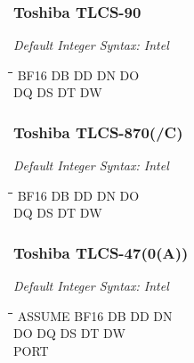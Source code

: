 \subsubsection{Toshiba TLCS-90}

{\em Default Integer Syntax: Intel}

{\tt\begin{tabbing}
\hspace{3cm}\=\hspace{3cm}\=\hspace{3cm}\=\hspace{3cm}\=\kill
BF16       \> DB         \> DD          \> DN          \> DO \\
DQ         \> DS         \> DT          \> DW \\
\end{tabbing}}

\subsubsection{Toshiba TLCS-870(/C)}

{\em Default Integer Syntax: Intel}

{\tt\begin{tabbing}
\hspace{3cm}\=\hspace{3cm}\=\hspace{3cm}\=\hspace{3cm}\=\kill
BF16       \> DB         \> DD          \> DN         \> DO \\
DQ         \> DS         \> DT          \> DW \\
\end{tabbing}}

\subsubsection{Toshiba TLCS-47(0(A))}

{\em Default Integer Syntax: Intel}

{\tt\begin{tabbing}
\hspace{3cm}\=\hspace{3cm}\=\hspace{3cm}\=\hspace{3cm}\=\kill
ASSUME     \> BF16        \> DB         \> DD         \> DN \\
DO         \> DQ          \> DS         \> DT         \> DW \\
PORT \\
\end{tabbing}}

